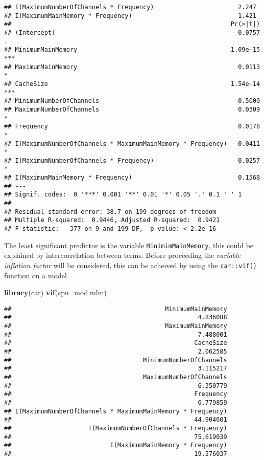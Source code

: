 \documentclass[12pt]{article}
\newenvironment{Shaded}{\begin{snugshade}}{\end{snugshade}}
\newcommand{\KeywordTok}[1]{\textcolor[rgb]{0.13,0.29,0.53}{\textbf{#1}}}
\newcommand{\NormalTok}[1]{#1}
\begin{document}
\begin{verbatim}
## I(MaximumNumberOfChannels * Frequency)                       2.247
## I(MaximumMainMemory * Frequency)                             1.421
##                                                            Pr(>|t|)    
## (Intercept)                                                  0.0757 .  
## MinimumMainMemory                                          1.09e-15 ***
## MaximumMainMemory                                            0.0113 *  
## CacheSize                                                  1.54e-14 ***
## MinimumNumberOfChannels                                      0.5000    
## MaximumNumberOfChannels                                      0.0309 *  
## Frequency                                                    0.0178 *  
## I(MaximumNumberOfChannels * MaximumMainMemory * Frequency)   0.0411 *  
## I(MaximumNumberOfChannels * Frequency)                       0.0257 *  
## I(MaximumMainMemory * Frequency)                             0.1568    
## ---
## Signif. codes:  0 '***' 0.001 '**' 0.01 '*' 0.05 '.' 0.1 ' ' 1
## 
## Residual standard error: 38.7 on 199 degrees of freedom
## Multiple R-squared:  0.9446, Adjusted R-squared:  0.9421 
## F-statistic:   377 on 9 and 199 DF,  p-value: < 2.2e-16
\end{verbatim}

The least significant predictor is the variable
\texttt{MinimimMainMemory}, this could be explained by intercorrelation
between terms. Before proceeding the \emph{variable inflation factor}
will be considered, this can be acheived by using the
\texttt{car::vif()} function on a model.

\begin{Shaded}
\begin{Highlighting}[]
\KeywordTok{library}\NormalTok{(car)}
\KeywordTok{vif}\NormalTok{(cpu_mod.mlm)}
\end{Highlighting}
\end{Shaded}

\begin{verbatim}
##                                          MinimumMainMemory 
##                                                   4.836088 
##                                          MaximumMainMemory 
##                                                   7.488001 
##                                                  CacheSize 
##                                                   2.062585 
##                                    MinimumNumberOfChannels 
##                                                   3.115217 
##                                    MaximumNumberOfChannels 
##                                                   6.350779 
##                                                  Frequency 
##                                                   6.779859 
## I(MaximumNumberOfChannels * MaximumMainMemory * Frequency) 
##                                                  44.904601 
##                     I(MaximumNumberOfChannels * Frequency) 
##                                                  75.619039 
##                           I(MaximumMainMemory * Frequency) 
##                                                  19.576037
\end{verbatim}
\end{document}

